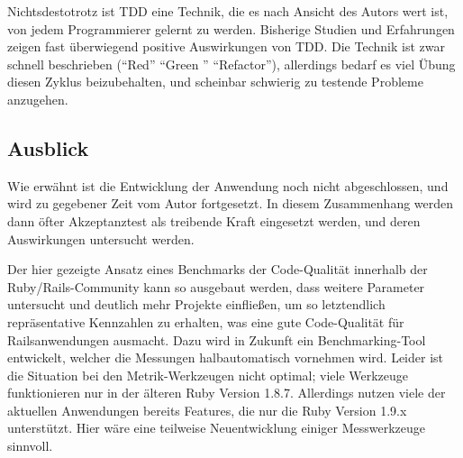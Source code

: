 Nichtsdestotrotz ist TDD eine Technik, die es nach Ansicht des Autors wert ist, von jedem Programmierer gelernt zu werden. Bisherige Studien und Erfahrungen zeigen fast überwiegend positive Auswirkungen von TDD. Die Technik ist zwar schnell beschrieben ("`Red"' "`Green "' "`Refactor"'), allerdings bedarf es viel Übung diesen Zyklus beizubehalten, und scheinbar schwierig zu testende Probleme anzugehen.

%   
%   
%     


\subsection{Ausblick}
Wie erwähnt ist die Entwicklung der Anwendung noch nicht abgeschlossen, und wird zu gegebener Zeit vom Autor fortgesetzt. In diesem Zusammenhang werden dann öfter Akzeptanztest als treibende Kraft eingesetzt werden, und deren Auswirkungen untersucht werden.

Der hier gezeigte Ansatz eines Benchmarks der Code-Qualität innerhalb der Ruby/Rails-Community kann so ausgebaut werden, dass weitere Parameter untersucht und deutlich mehr Projekte einfließen, um so letztendlich repräsentative Kennzahlen zu erhalten, was eine gute Code-Qualität für Railsanwendungen ausmacht. Dazu wird in Zukunft ein Benchmarking-Tool entwickelt, welcher die Messungen halbautomatisch vornehmen wird. Leider ist die Situation bei den Metrik-Werkzeugen nicht optimal; viele Werkzeuge funktionieren nur in der älteren Ruby Version 1.8.7. Allerdings nutzen viele der aktuellen Anwendungen bereits Features, die nur die Ruby Version 1.9.x unterstützt. Hier wäre eine teilweise Neuentwicklung einiger Messwerkzeuge sinnvoll.

